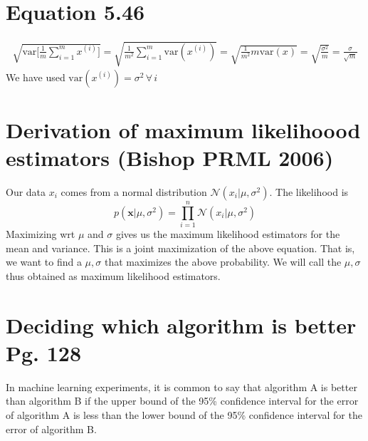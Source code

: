 \documentclass{article}
\newcommand{\beq}{\begin{equation}}
\newcommand{\eeq}{\end{equation}}
\newcommand{\ber}{\begin{eqnarray}}
\newcommand{\eer}{\end{eqnarray}}
\begin{document}
\section{Equation 5.46}
\ber
\sqrt{\text{var}\Big[\frac{1}{m}\sum_{i=1}^{m}x^{(i)}\Big]} = \sqrt{\frac{1}{m^2}\sum_{i=1}^{m}\text{var}(x^{(i)})} = \sqrt{\frac{1}{m^2}m\text{var}(x)} = \sqrt{\frac{\sigma^2}{m}} = \frac{\sigma}{\sqrt{m}}
\eer
We have used $\text{var}(x^{(i)})=\sigma^2\,\forall\,i$
%
%
%
\section{Derivation of maximum likelihoood estimators (Bishop PRML 2006) }
Our data $x_i$ comes from a normal distribution $\mathcal{N}(x_i|\mu,\sigma^2)$. The likelihood is
\beq
p(\pmb{x}|\mu,\sigma^2)=\prod_{i=1}^{n}\mathcal{N}(x_i|\mu,\sigma^2)
\eeq
Maximizing wrt $\mu$ and $\sigma$ gives us the maximum likelihood estimators for the mean and variance. This is a joint maximization of the above equation. That is, we want to find a $\mu,\sigma$  that maximizes the above probability. We will call the $\mu,\sigma$ thus obtained as maximum likelihood estimators.
%
%
%
\section{Deciding which algorithm is better Pg. 128}
In machine learning experiments, it is common to say that algorithm A is better than algorithm B if the upper bound of the 95\% conﬁdence interval for the error of algorithm A is less than the lower bound of the 95\% conﬁdence interval for the error of algorithm B.
\end{document}

